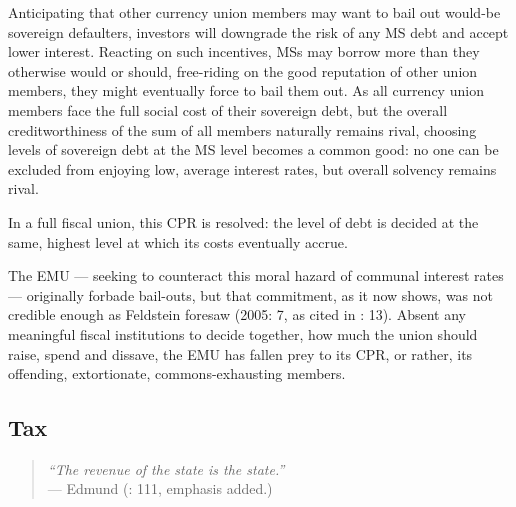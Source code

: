 \documentclass[11pt,a4paper,oneside,openright]{article}
\begin{document}
Anticipating that other currency union members may want to bail out would-be sovereign defaulters, investors will downgrade the risk of any \gls{MS} debt and accept lower interest. 
Reacting on such incentives, \glspl{MS} may borrow more than they otherwise would or should, free-riding on the good reputation of other union members, they might eventually force to bail them out. 
As all currency union members face the full social cost of their sovereign debt, but the overall creditworthiness of the sum of all members naturally remains rival, choosing levels of sovereign debt at the \gls{MS} level becomes a common good: 
no one can be excluded from enjoying low, average interest rates, but overall solvency remains rival.

In a full fiscal union, this \gls{CPR} is resolved: 
the level of debt is decided at the same, highest level at which its costs eventually accrue. 

The \gls{EMU} --- seeking to counteract this moral hazard of communal interest rates --- originally forbade bail-outs, but that commitment, as it now shows, was not credible enough as Feldstein foresaw (2005: 7, as cited in \citealt{Begg2008}: 13). 
Absent any meaningful fiscal institutions to decide together, how much the union should raise, spend and dissave, the \gls{EMU} has fallen prey to its \gls{CPR}, or rather, its offending, extortionate, commons-exhausting members. 

\subsection{Tax}

\begin{quote}
	\emph{``The revenue of the state \emph{is} the state.''}\\
	--- Edmund \citeauthor{Burke1790} (\citeyear{Burke1790}: 111, emphasis added.)
\end{quote}
\end{document}
